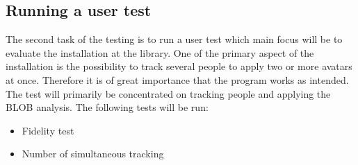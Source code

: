 \subsection{Running a user test}
The second task of the testing is to run a user test which main focus will be to evaluate the installation at the library. One of the primary aspect of the installation is the possibility to track several people to apply two or more avatars at once. Therefore it is of great importance that the program works as intended.\\
The test will primarily be concentrated on tracking people and applying the BLOB analysis. The following tests will be run:  
\begin{itemize}
\item Fidelity test
\item Number of simultaneous tracking
\end{itemize}


